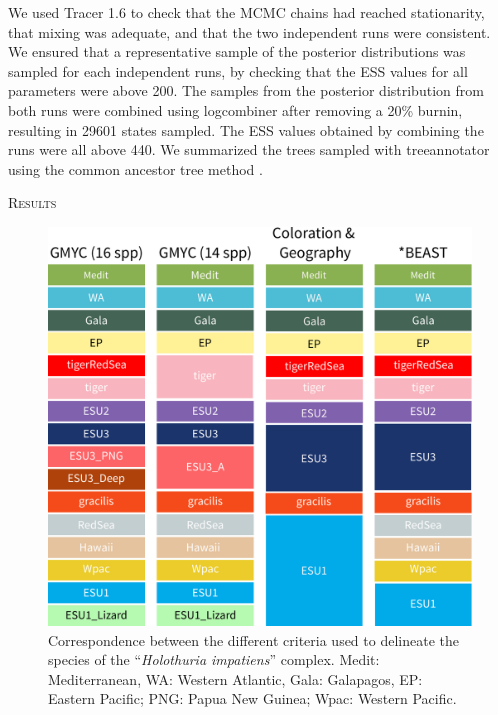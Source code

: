 \documentclass[12pt,letterpaper]{article}\usepackage[]{graphicx}\usepackage[]{color}
\renewcommand{\section}[1]{%
\bigskip
\begin{center}
\begin{Large}
\normalfont\scshape #1
\medskip
\end{Large}
\end{center}}
\begin{document}
We used Tracer 1.6 to check that the MCMC chains had reached stationarity, that
mixing was adequate, and that the two independent runs were consistent. We
ensured that a representative sample of the posterior distributions was sampled
for each independent runs, by checking that the ESS values for all parameters
were above 200. The samples from the posterior distribution from both runs were
combined using logcombiner after removing a 20\% burnin, resulting in 29601
states sampled. The ESS values obtained by combining the runs were all above
440. We summarized the trees sampled with treeannotator using the common ancestor
tree method \citep{Heled2013}.



\section{Results}

\begin{figure}
  \centering
    \includegraphics[width=6.5in]{figures-manual/species_limits.pdf}
    \caption{Correspondence between the different criteria used to delineate the
      species of the ``\textit{Holothuria impatiens}'' complex. Medit:
      Mediterranean, WA: Western Atlantic, Gala: Galapagos, EP: Eastern Pacific;
      PNG: Papua New Guinea; Wpac: Western Pacific.}
    \label{fig:species-limits}
\end{figure}
\end{document}
